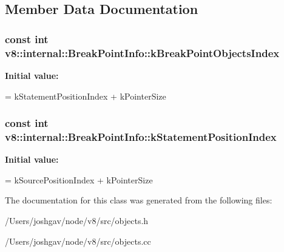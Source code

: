 \subsection{Member Data Documentation}
\subsubsection[{\texorpdfstring{k\+Break\+Point\+Objects\+Index}{kBreakPointObjectsIndex}}]{\setlength{\rightskip}{0pt plus 5cm}const int v8\+::internal\+::\+Break\+Point\+Info\+::k\+Break\+Point\+Objects\+Index\hspace{0.3cm}{\ttfamily [static]}}\hypertarget{classv8_1_1internal_1_1_break_point_info_ae4ecacd32915b48357a34430c701256f}{}\label{classv8_1_1internal_1_1_break_point_info_ae4ecacd32915b48357a34430c701256f}
{\bfseries Initial value\+:}
\begin{DoxyCode}
=
      kStatementPositionIndex + kPointerSize
\end{DoxyCode}
\subsubsection[{\texorpdfstring{k\+Statement\+Position\+Index}{kStatementPositionIndex}}]{\setlength{\rightskip}{0pt plus 5cm}const int v8\+::internal\+::\+Break\+Point\+Info\+::k\+Statement\+Position\+Index\hspace{0.3cm}{\ttfamily [static]}}\hypertarget{classv8_1_1internal_1_1_break_point_info_a4faddc22ed2545a08c99fae693c638cf}{}\label{classv8_1_1internal_1_1_break_point_info_a4faddc22ed2545a08c99fae693c638cf}
{\bfseries Initial value\+:}
\begin{DoxyCode}
=
      kSourcePositionIndex + kPointerSize
\end{DoxyCode}


The documentation for this class was generated from the following files\+:\begin{DoxyCompactItemize}
\item 
/\+Users/joshgav/node/v8/src/objects.\+h\item 
/\+Users/joshgav/node/v8/src/objects.\+cc\end{DoxyCompactItemize}
